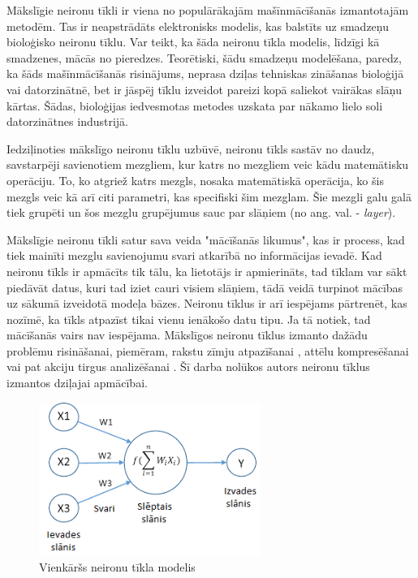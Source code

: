 Mākslīgie neironu tīkli ir viena no populārākajām mašīnmācīšanās izmantotajām metodēm. Tas ir neapstrādāts elektronisks modelis, kas balstīts uz smadzeņu bioloģisko neironu tīklu. Var teikt, ka šāda neironu tīkla modelis, līdzīgi kā smadzenes, mācās no pieredzes. Teorētiski, šādu smadzeņu modelēšana, paredz, ka šāds mašīnmācīšanās risinājums, neprasa dziļas tehniskas zināšanas bioloģijā vai datorzinātnē, bet ir jāspēj tīklu izveidot pareizi kopā saliekot vairākas slāņu kārtas. Šādas, bioloģijas iedvesmotas metodes uzskata par nākamo lielo soli datorzinātnes industrijā.\cite{staff} \par
Iedziļinoties mākslīgo neironu tīklu uzbūvē, neironu tīkls sastāv no daudz, savstarpēji savienotiem mezgliem, kur katrs no mezgliem veic kādu matemātisku operāciju. To, ko atgriež katrs mezgls, nosaka matemātiskā operācija, ko šis mezgls veic kā arī citi parametri, kas specifiski šim mezglam. Šie mezgli galu galā tiek grupēti un šos mezglu grupējumus sauc par slāņiem (no ang. val. - \textit{layer}). \par
Mākslīgie neironu tīkli satur sava veida "mācīšanās likumus", kas ir process, kad tiek mainīti mezglu savienojumu svari atkarībā no informācijas ievadē. 
Kad neironu tīkls ir apmācīts tik tālu, ka lietotājs ir apmierināts, tad tīklam var sākt piedāvāt datus, kuri tad iziet cauri visiem slāņiem, tādā veidā turpinot mācības uz sākumā izveidotā modeļa bāzes. Neironu tīklus ir arī iespējams pārtrenēt, kas nozīmē, ka tīkls atpazīst tikai vienu ienākošo datu tipu. Ja tā notiek, tad mācīšanās vairs nav iespējama. Mākslīgos neironu tīklus izmanto dažādu problēmu risināšanai, piemēram, rakstu zīmju atpazīšanai \cite{nnchars}, attēlu kompresēšanai \cite{dony1995neural} vai pat akciju tirgus analizēšanai \cite{kimoto1990stock}. Šī darba nolūkos autors neironu tīklus izmantos dziļajai apmācībai.
\begin{figure}[h]%
	\centering
	\includegraphics[height=5cm]{images/neironutikls.png} %
	\caption{Vienkāršs neironu tīkla modelis}%
	\label{fig:example}%
\end{figure}
